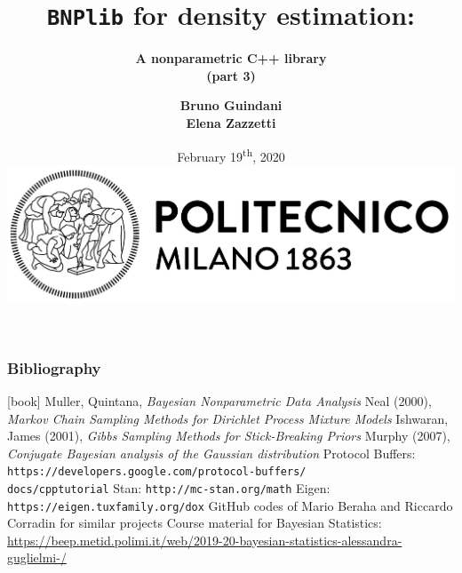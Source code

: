 \documentclass{beamer}
\title[BNPlib]{\textbf{\texttt{BNPlib} for density estimation:}}
\subtitle{\textbf{A nonparametric C++ library \\ (part 3)}}
\author[Guindani, Zazzetti]{\textbf{Bruno Guindani \\ Elena Zazzetti}}
\institute[PoliMi]{}
\date[2020/02/19]{
	February 19\textsuperscript{th}, 2020 \\[15pt]
	\includegraphics[scale=.35]{../etc/logo_long.jpg}
}
\begin{document}





\begin{frame}
	\small
	\frametitle{Bibliography}
	\begin{thebibliography}{9}
		 Muller, Quintana, \textit{Bayesian Nonparametric Data Analysis}
		 Neal (2000), \textit{Markov Chain Sampling Methods for Dirichlet Process Mixture Models}
		 Ishwaran, James (2001), \textit{Gibbs Sampling Methods for Stick-Breaking Priors}
		 Murphy (2007), \textit{Conjugate Bayesian analysis of the Gaussian distribution}
		 Protocol Buffers: \texttt{https://developers.google.com/protocol-buffers/} \\
		\texttt{docs/cpptutorial}
		 Stan: \texttt{http://mc-stan.org/math}
		 Eigen: \texttt{https://eigen.tuxfamily.org/dox}
		 GitHub codes of Mario Beraha and Riccardo Corradin for similar projects
		 Course material for Bayesian Statistics: \url{https://beep.metid.polimi.it/web/2019-20-bayesian-statistics-alessandra-guglielmi-/}
	\end{thebibliography}
\end{frame}
\end{document}
